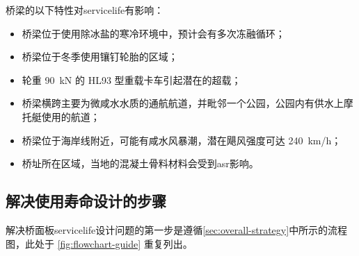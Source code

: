 桥梁的以下特性对\gls*{servicelife}有影响：
\begin{itemize}
  \item 桥梁位于使用除冰盐的寒冷环境中，预计会有多次冻融循环；
  \item 桥梁位于冬季使用镶钉轮胎的区域；
  \item 轮重 \qty{90}{kN} 的 HL93 型重载卡车引起潜在的超载；
  \item 桥梁横跨主要为微咸水水质的通航航道，并毗邻一个公园，公园内有供水上摩托艇使用的航道；
  \item 桥梁位于海岸线附近，可能有咸水风暴潮，潜在飓风强度可达 \qty{240}{km/h}；
  \item 桥址所在区域，当地的混凝土骨料材料会受到\acrfull{asr}影响。
\end{itemize}


\subsection{解决使用寿命设计的步骤}
解决桥面板\gls*{servicelife}设计问题的第一步是遵循\cref{sec:overall-strategy}中所示的流程图，此处于 \cref{fig:flowchart-guide} 重复列出。


